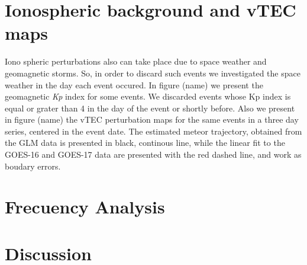 \documentclass[times,twocolumn,final,authoryear]{elsarticle}
\begin{document}
     
\section{Ionospheric background and vTEC maps}
\label{sec:vTEC maps}
     
     
Iono spheric perturbations also can take place due to space weather and geomagnetic storms. So, in order to discard such events we investigated the space weather in the day each event occured. In figure (name) we present the geomagnetic \textit{Kp} index for some events. We discarded events whose Kp index is equal or grater than 4 in the day of the event or shortly before. Also we present in figure (name) the vTEC perturbation maps for the same events in a three day series, centered in the event date. The estimated meteor trajectory, obtained from the GLM data is presented in black, continous line, while the linear fit to the GOES-16 and GOES-17 data are presented with the red dashed line, and work as boudary errors.
     
     
\section{Frecuency Analysis}
     
\section{Discussion}
     

   
\end{document}
